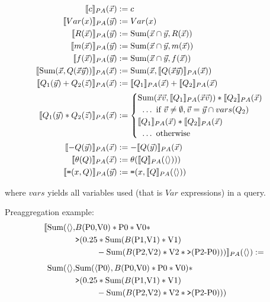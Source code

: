 \begin{align*}
\llbracket c \rrbracket_{PA}(\vec{x}) & := c
\\
\llbracket Var(x) \rrbracket_{PA}(\vec{y}) & := Var(x)
\\
\llbracket R(\vec{x}) \rrbracket_{PA}(\vec{y}) & := \mbox{Sum}(\vec{x} \cap \vec{y}, R(\vec{x}))
\\
\llbracket m(\vec{x}) \rrbracket_{PA}(\vec{y}) & := \mbox{Sum}(\vec{x} \cap \vec{y}, m(\vec{x}))
\\
\llbracket f(\vec{x}) \rrbracket_{PA}(\vec{y}) & := \mbox{Sum}(\vec{x} \cap \vec{y}, f(\vec{x}))
\\
\llbracket \mbox{Sum}(\vec{x}, Q(\vec{x}\vec{y})) \rrbracket_{PA}(\vec{x}) & :=
    \mbox{Sum}(\vec{x}, \llbracket Q(\vec{x}\vec{y}) \rrbracket_{PA}(\vec{x}))
\\
\llbracket Q_1(\vec{y}) + Q_2(\vec{z}) \rrbracket_{PA}(\vec{x}) & :=
    \llbracket Q_1 \rrbracket_{PA}(\vec{x}) + \llbracket Q_2 \rrbracket_{PA}(\vec{x})
\\
\llbracket Q_1(\vec{y}) * Q_2(\vec{z}) \rrbracket_{PA}(\vec{x}) & :=
    \begin{cases}
    \mbox{Sum}(\vec{x}\vec{v}, 
        \llbracket Q_1 \rrbracket_{PA}(\vec{x}\vec{v})) * \llbracket Q_2 \rrbracket_{PA}(\vec{x}) \\
    \; \; \ldots
        \mbox{ if $\vec{v} \neq \emptyset$},\vec{v} = \vec{y} \cap vars(Q_2)\\
    \llbracket Q_1 \rrbracket_{PA}(\vec{x}) * \llbracket Q_2 \rrbracket_{PA}(\vec{x}) \\
    \; \; \ldots \mbox{ otherwise}
    \end{cases}
\\
\llbracket -Q(\vec{y}) \rrbracket_{PA}(\vec{x}) & := -\llbracket Q(\vec{y}) \rrbracket_{PA}(\vec{x})
\\
\llbracket \theta(Q) \rrbracket_{PA}(\vec{x}) & := \theta(\llbracket Q \rrbracket_{PA}({\langle\rangle})))
\\
\llbracket \mbox{{\tt =}}(x,Q) \rrbracket_{PA}(\vec{y}) & := \mbox{{\tt =}}(x, \llbracket Q \rrbracket_{PA}({\langle\rangle}))
\end{align*}

\noindent where $vars$ yields all variables used (that is $Var$ expressions)
in a query.

\noindent Preaggregation example:
\begin{align*}
\llbracket \mbox{Sum}({\langle\rangle},
& B(\mbox{P0,V0}) * \mbox{P0} * \mbox{V0} *\\
& \mbox{{\tt >}}(0.25 * \mbox{Sum}(B(\mbox{P1,V1}) * \mbox{V1}) \\
& \qquad \; \; - \mbox{Sum}(B(\mbox{P2,V2}) * \mbox{V2} * \mbox{{\tt >}}(\mbox{P2-P0}))) \rrbracket_{PA}({\langle\rangle}) :=
\\[1ex]
\mbox{Sum}({\langle\rangle},
& \mbox{Sum}({\langle\mbox{P0}\rangle}, B(\mbox{P0,V0}) * \mbox{P0} * \mbox{V0}) *\\
& \mbox{{\tt >}}(0.25 * \mbox{Sum}(B(\mbox{P1,V1}) * \mbox{V1}) \\
& \qquad \; \; - \mbox{Sum}(B(\mbox{P2,V2}) * \mbox{V2} * \mbox{{\tt >}}(\mbox{P2-P0})))
\end{align*}

